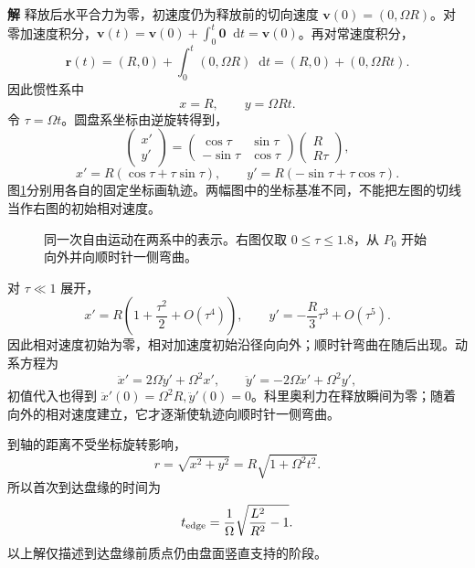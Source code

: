 \documentclass[11pt,openany,fontset=fandol]{ctexbook}
\theoremstyle{definition}\newtheorem{example}{例}[chapter]\newtheorem{exercise}{习题}[chapter]
\newcommand{\SolutionStart}{\par\medskip\ifdim\pagetotal>0pt\ifdim\dimexpr\pagegoal-\pagetotal\relax<3\baselineskip\newpage\fi\fi\noindent\textbf{解}\quad\ignorespaces}
\newenvironment{solution}{\SolutionStart}{\par\medskip}
\newcommand{\dd}{\mathop{}\!\mathrm d}\newcommand{\ee}{\mathrm e}\newcommand{\vct}[1]{\bm{#1}}
\begin{document}
\begin{solution}
释放后水平合力为零，初速度仍为释放前的切向速度 $\vct v(0)=(0,\Omega R)$。对零加速度积分，$\vct v(t)=\vct v(0)+\int_0^t\vct0\dd t=\vct v(0)$。再对常速度积分，
\[
\vct r(t)=(R,0)+\int_0^t(0,\Omega R)\dd t
=(R,0)+(0,\Omega Rt).
\]
因此惯性系中
\[
x=R,\qquad y=\Omega Rt.
\]
令 $\tau=\Omega t$。圆盘系坐标由逆旋转得到，
\[
\begin{pmatrix}x'\\y'\end{pmatrix}
=\begin{pmatrix}\cos\tau&\sin\tau\\-\sin\tau&\cos\tau\end{pmatrix}
\begin{pmatrix}R\\R\tau\end{pmatrix},
\]
\[
x'=R(\cos\tau+\tau\sin\tau),\qquad
y'=R(-\sin\tau+\tau\cos\tau).
\]
图\ref{mp3:fig:l3-e11-s}分别用各自的固定坐标画轨迹。两幅图中的坐标基准不同，不能把左图的切线当作右图的初始相对速度。

\begin{figure}[H]\centering
{}
\caption{同一次自由运动在两系中的表示。右图仅取 $0\le\tau\le1.8$，从 $P_0$ 开始向外并向顺时针一侧弯曲。}\label{mp3:fig:l3-e11-s}
\end{figure}


对 $\tau\ll1$ 展开，
\[
x'=R\left(1+\frac{\tau^2}{2}+O(\tau^4)\right),\qquad
y'=-\frac R3\tau^3+O(\tau^5).
\]
因此相对速度初始为零，相对加速度初始沿径向向外；顺时针弯曲在随后出现。动系方程为
\[
\ddot x'=2\Omega\dot y'+\Omega^2x',\qquad
\ddot y'=-2\Omega\dot x'+\Omega^2y',
\]
初值代入也得到 $\ddot x'(0)=\Omega^2R,\ddot y'(0)=0$。科里奥利力在释放瞬间为零；随着向外的相对速度建立，它才逐渐使轨迹向顺时针一侧弯曲。

到轴的距离不受坐标旋转影响，
\[
r=\sqrt{x^2+y^2}=R\sqrt{1+\Omega^2t^2}.
\]
所以首次到达盘缘的时间为
\[
t_{\rm edge}=\frac1\Omega\sqrt{\frac{L^2}{R^2}-1}.
\]
以上解仅描述到达盘缘前质点仍由盘面竖直支持的阶段。

\end{solution}
\end{document}
